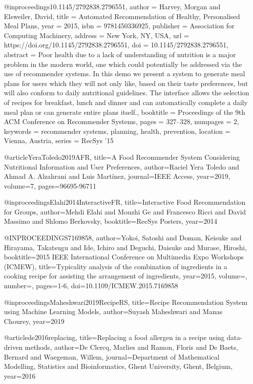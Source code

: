 @inproceedings{10.1145/2792838.2796551,
author = {Harvey, Morgan and Elsweiler, David},
title = {Automated Recommendation of Healthy, Personalised Meal Plans},
year = {2015},
isbn = {9781450336925},
publisher = {Association for Computing Machinery},
address = {New York, NY, USA},
url = {https://doi.org/10.1145/2792838.2796551},
doi = {10.1145/2792838.2796551},
abstract = {Poor health due to a lack of understanding of nutrition is a major problem in the modern world, one which could potentially be addressed via the use of recommender systems. In this demo we present a system to generate meal plans for users which they will not only like, based on their taste preferences, but will also conform to daily nutritional guidelines. The interface allows the selection of recipes for breakfast, lunch and dinner and can automatically complete a daily meal plan or can generate entire plans itself.},
booktitle = {Proceedings of the 9th ACM Conference on Recommender Systems},
pages = {327–328},
numpages = {2},
keywords = {recommender systems, planning, health, prevention},
location = {Vienna, Austria},
series = {RecSys '15}
}

@article{YeraToledo2019AFR,
  title={A Food Recommender System Considering Nutritional Information and User Preferences},
  author={Raciel Yera Toledo and Ahmad A. Alzahrani and Luis Mart{\'i}nez},
  journal={IEEE Access},
  year={2019},
  volume={7},
  pages={96695-96711}
}

@inproceedings{Elahi2014InteractiveFR,
  title={Interactive Food Recommendation for Groups},
  author={Mehdi Elahi and Mouzhi Ge and Francesco Ricci and David Massimo and Shlomo Berkovsky},
  booktitle={RecSys Posters},
  year={2014}
}

@INPROCEEDINGS{7169858,  author={Yokoi, Satoshi and Doman, Keisuke and Hirayama, Takatsugu and Ide, Ichiro and Deguchi, Daisuke and Murase, Hiroshi},  booktitle={2015 IEEE International Conference on Multimedia   Expo Workshops (ICMEW)},   title={Typicality analysis of the combination of ingredients in a cooking recipe for assisting the arrangement of ingredients},   year={2015},  volume={},  number={},  pages={1-6},  doi={10.1109/ICMEW.2015.7169858}}

@inproceedings{Maheshwari2019RecipeRS,
  title={Recipe Recommendation System using Machine Learning Models},
  author={Suyash Maheshwari and Manas Chourey},
  year={2019}
}

@article{de2016replacing,
  title={Replacing a food allergen in a recipe using data-driven methods},
  author={De Clercq, Marlies and Ramon, Floris and De Baets, Bernard and Waegeman, Willem},
  journal={Department of Mathematical Modelling, Statistics and Bioinformatics, Ghent University, Ghent, Belgium},
  year={2016}
}



